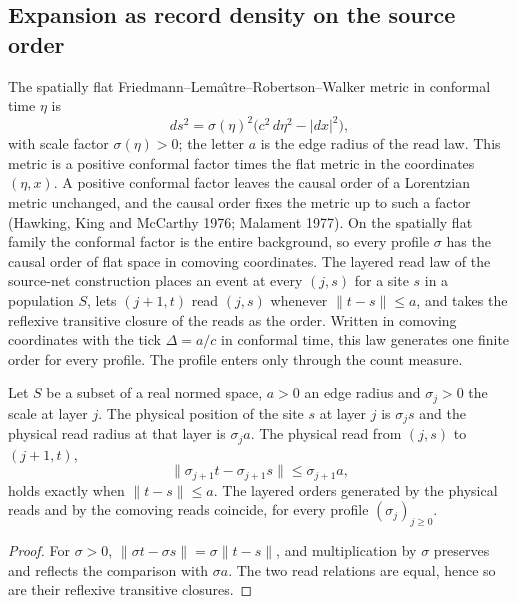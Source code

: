 \subsection{Expansion as record density on the source order}
\label{sec:flrw-record-density}

The spatially flat Friedmann--Lema\^{\i}tre--Robertson--Walker metric in
conformal time $\eta$ is
\begin{equation}
 ds^2=\sigma(\eta)^2\bigl(c^2\,d\eta^2-|dx|^2\bigr),
 \label{flrw:eq-metric}
\end{equation}
with scale factor $\sigma(\eta)>0$; the letter $a$ is the edge radius of the
read law. This metric is a positive conformal factor times the flat metric
in the coordinates $(\eta,x)$. A positive conformal factor leaves the causal
order of a Lorentzian metric unchanged, and the causal order fixes the
metric up to such a factor (Hawking, King and McCarthy 1976; Malament 1977).
On the spatially flat family the conformal factor is the entire background,
so every profile $\sigma$ has the causal order of flat space in comoving
coordinates. The layered read law of the source-net construction places an
event at every $(j,s)$ for a site $s$ in a population $S$, lets $(j+1,t)$
read $(j,s)$ whenever $\|t-s\|\le a$, and takes the reflexive transitive
closure of the reads as the order. Written in comoving coordinates with the
tick $\Delta=a/c$ in conformal time, this law generates one finite order for
every profile. The profile enters only through the count measure.

\begin{proposition}
\label{flrw:order-invariance}
Let $S$ be a subset of a real normed space, $a>0$ an edge radius and
$\sigma_j>0$ the scale at layer $j$. The physical position of the site $s$
at layer $j$ is $\sigma_js$ and the physical read radius at that layer is
$\sigma_ja$. The physical read from $(j,s)$ to $(j+1,t)$,
\[
 \|\sigma_{j+1}t-\sigma_{j+1}s\|\le\sigma_{j+1}a,
\]
holds exactly when $\|t-s\|\le a$. The layered orders generated by the
physical reads and by the comoving reads coincide, for every profile
$(\sigma_j)_{j\ge0}$.
\end{proposition}
\begin{proof}
For $\sigma>0$, $\|\sigma t-\sigma s\|=\sigma\|t-s\|$, and multiplication
by $\sigma$ preserves and reflects the comparison with $\sigma a$. The two
read relations are equal, hence so are their reflexive transitive closures.
\end{proof}

